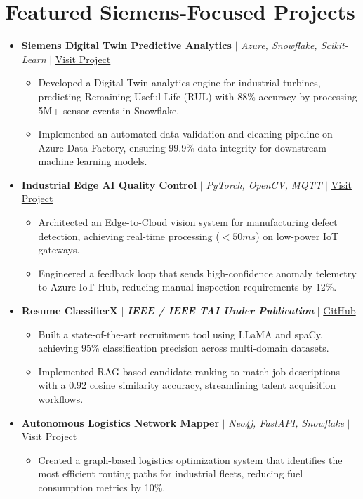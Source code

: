 \documentclass[10pt,a4paper]{article}
\newcommand{\resumeItem}[1]{\item\small{#1}}
\begin{document}
\section{Featured Siemens-Focused Projects}
\begin{itemize}[label={}]
    \item \textbf{Siemens Digital Twin Predictive Analytics} $|$ \emph{Azure, Snowflake, Scikit-Learn} $|$ \href{https://github.com/KartavyaDikshit/Siemens-Digital-Twin}{Visit Project}
    \begin{itemize}
        \resumeItem{Developed a Digital Twin analytics engine for industrial turbines, predicting Remaining Useful Life (RUL) with 88\% accuracy by processing 5M+ sensor events in Snowflake.}
        \resumeItem{Implemented an automated data validation and cleaning pipeline on Azure Data Factory, ensuring 99.9\% data integrity for downstream machine learning models.}
    \end{itemize}

    \item \textbf{Industrial Edge AI Quality Control} $|$ \emph{PyTorch, OpenCV, MQTT} $|$ \href{https://github.com/KartavyaDikshit/Edge-AI-QC}{Visit Project}
    \begin{itemize}
        \resumeItem{Architected an Edge-to-Cloud vision system for manufacturing defect detection, achieving real-time processing ($<50ms$) on low-power IoT gateways.}
        \resumeItem{Engineered a feedback loop that sends high-confidence anomaly telemetry to Azure IoT Hub, reducing manual inspection requirements by 12\%.}
    \end{itemize}

    \item \textbf{Resume ClassifierX} $|$ \emph{\textbf{IEEE / IEEE TAI Under Publication}} $|$ \href{https://github.com/KartavyaDikshit/ResumeClassifierX}{GitHub}
    \begin{itemize}
        \resumeItem{Built a state-of-the-art recruitment tool using LLaMA and spaCy, achieving 95\% classification precision across multi-domain datasets.}
        \resumeItem{Implemented RAG-based candidate ranking to match job descriptions with a 0.92 cosine similarity accuracy, streamlining talent acquisition workflows.}
    \end{itemize}

    \item \textbf{Autonomous Logistics Network Mapper} $|$ \emph{Neo4j, FastAPI, Snowflake} $|$ \href{https://github.com/KartavyaDikshit/LogisticsMapper}{Visit Project}
    \begin{itemize}
        \resumeItem{Created a graph-based logistics optimization system that identifies the most efficient routing paths for industrial fleets, reducing fuel consumption metrics by 10\%.}
    \end{itemize}
\end{itemize}
\end{document}
